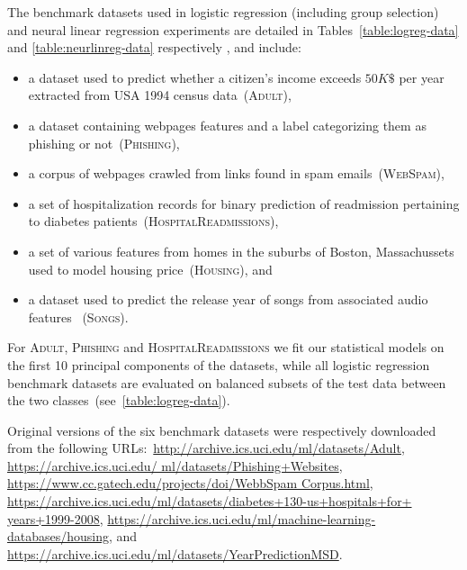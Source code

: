The benchmark datasets used in logistic regression (including group selection) and neural linear regression experiments are detailed in Tables~\ref{table:logreg-data} and \ref{table:neurlinreg-data} respectively%
, and include: 
\begin{itemize}
	\item a dataset used to predict whether a citizen's income exceeds $50K \$$ per year extracted from USA 1994 census data~(\textsc{Adult}),
	\item a dataset containing webpages features and a label categorizing them as phishing or not~(\textsc{Phishing}),
	\item a corpus of webpages crawled from links found in spam emails~(\textsc{WebSpam}),
	\item a set of hospitalization records for binary prediction of readmission pertaining to diabetes patients~(\textsc{HospitalReadmissions}),
	\item a set of various features from homes in the suburbs of Boston, Massachussets used to model housing price~(\textsc{Housing}), and
	\item a dataset used to predict the release year of songs from associated audio features ~(\textsc{Songs}).
\end{itemize} 

For \textsc{Adult}, \textsc{Phishing} and \textsc{HospitalReadmissions} we fit our statistical models on the first 10 principal components of the datasets, while  all logistic regression benchmark datasets are evaluated on balanced subsets of the test data between the two classes~(see~\cref{table:logreg-data}).

Original versions of the six benchmark datasets were respectively downloaded from the following URLs:~\href{http://archive.ics.uci.edu/ml/datasets/Adult}{http://archive.ics.uci.edu/ml/datasets/Adult},  \href{https://archive.ics.uci.edu/ml/datasets/Phishing+Websites}{https://archive.ics.uci.edu/ ml/datasets/Phishing+Websites}, \href{https://www.cc.gatech.edu/projects/doi/WebbSpamCorpus.html}{https://www.cc.gatech.edu/projects/doi/WebbSpam Corpus.html}, \href{https://archive.ics.uci.edu/ml/datasets/diabetes+130-us+hospitals+for+years+1999-2008}{https://archive.ics.uci.edu/ml/datasets/diabetes+130-us+hospitals+for+ years+1999-2008}, \href{https://archive.ics.uci.edu/ml/machine-learning-databases/housing}{https://archive.ics.uci.edu/ml/machine-learning-databases/housing}, and \href{https://archive.ics.uci.edu/ml/datasets/YearPredictionMSD}{https://archive.ics.uci.edu/ml/datasets/YearPredictionMSD}. 
